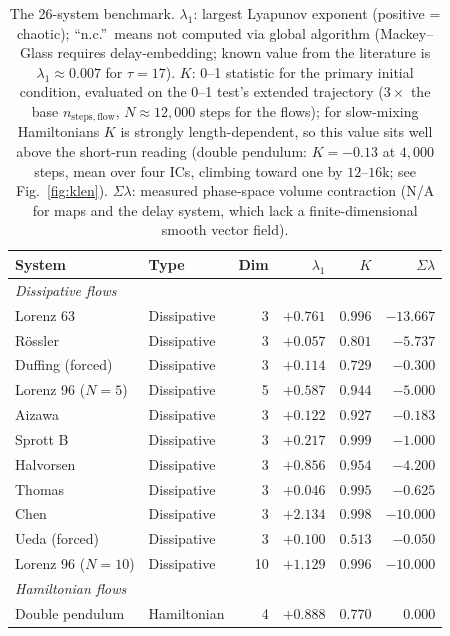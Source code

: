 \documentclass[aip,cha,preprint,amsmath,amssymb,floatfix]{revtex4-2}
\begin{document}
\begin{table}[ht]
\centering
\small
\caption{The 26-system benchmark. $\lambda_1$: largest Lyapunov exponent (positive
= chaotic); ``n.c.''\ means not computed via global algorithm (Mackey--Glass
requires delay-embedding; known value from the literature is $\lambda_1\approx0.007$
for $\tau=17$). $K$: 0--1 statistic for the primary initial condition, evaluated on the 0--1
test's extended trajectory ($3\times$ the base $n_{\mathrm{steps,flow}}$,
$N\approx12{,}000$ steps for the flows); for slow-mixing Hamiltonians $K$ is
strongly length-dependent, so this value sits well above the short-run reading
(double pendulum: $K=-0.13$ at $4{,}000$ steps, mean over four ICs, climbing
toward one by $12$--$16$k; see Fig.~\ref{fig:klen}). $\Sigma\lambda$: measured
phase-space volume contraction (N/A for maps and the delay system, which lack a
finite-dimensional smooth vector field).}
\label{tab:systems}
\begin{tabular}{llr r r r}
\toprule
System & Type & Dim & $\lambda_1$ & $K$ & $\Sigma\lambda$ \\
\midrule
\multicolumn{6}{l}{\textit{Dissipative flows}} \\
Lorenz 63          & Dissipative & 3  & $+0.761$ & $0.996$ & $-13.667$ \\
R\"{o}ssler        & Dissipative & 3  & $+0.057$ & $0.801$ & $-5.737$  \\
Duffing (forced)   & Dissipative & 3  & $+0.114$ & $0.729$ & $-0.300$  \\
Lorenz 96 ($N=5$)  & Dissipative & 5  & $+0.587$ & $0.944$ & $-5.000$  \\
Aizawa             & Dissipative & 3  & $+0.122$ & $0.927$ & $-0.183$  \\
Sprott B           & Dissipative & 3  & $+0.217$ & $0.999$ & $-1.000$  \\
Halvorsen          & Dissipative & 3  & $+0.856$ & $0.954$ & $-4.200$  \\
Thomas             & Dissipative & 3  & $+0.046$ & $0.995$ & $-0.625$  \\
Chen               & Dissipative & 3  & $+2.134$ & $0.998$ & $-10.000$ \\
Ueda (forced)      & Dissipative & 3  & $+0.100$ & $0.513$ & $-0.050$  \\
Lorenz 96 ($N=10$) & Dissipative & 10 & $+1.129$ & $0.996$ & $-10.000$ \\
\midrule
\multicolumn{6}{l}{\textit{Hamiltonian flows}} \\
Double pendulum          & Hamiltonian & 4 & $+0.888$ & $0.770$ & $0.000$ \\

\end{tabular}
\end{table}
\end{document}
